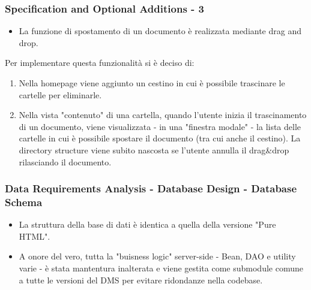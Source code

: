 \documentclass[aspectratio=169, dvipsnames]{beamer}
\begin{document}
\begin{frame}
    \frametitle{Specification and Optional Additions - 3}
    \begin{itemize}
        \item La funzione di spostamento di un documento è realizzata mediante drag and drop.
    \end{itemize}
    \vspace{0.4cm}
    Per implementare questa funzionalità si è deciso di:
    \begin{enumerate}
        \item Nella homepage viene aggiunto un cestino in cui è possibile trascinare le cartelle per eliminarle.
        \item Nella vista "contenuto" di una cartella, quando l'utente inizia il trascinamento di un documento,
              viene visualizzata - in una "finestra modale" - la lista delle cartelle in cui è possibile spostare il
              documento (tra cui anche il cestino). La directory structure viene subito nascosta se l'utente annulla
              il drag\&drop rilasciando il documento.
    \end{enumerate}
\end{frame}

\begin{frame}
    \frametitle{Data Requirements Analysis - Database Design - Database Schema}
    \begin{itemize}
        \item La struttura della base di dati è identica a quella della versione "Pure HTML".
        \item A onore del vero, tutta la "buisness logic" server-side - Bean, DAO e utility varie - è stata mantentura
              inalterata e viene gestita come submodule comune a tutte le versioni del DMS per evitare ridondanze nella
              codebase.
    \end{itemize}
\end{frame}
\end{document}

